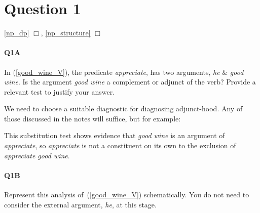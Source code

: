 \documentclass{article}
\begin{document}
\maketitle
\subtitle{Tutorial Notes Week 7: Topics 7 \& 8}

\section*{Question 1}%
\hfill{} \ref{np_dp} $\Box$,
\ref{np_structure} $\Box$

\paragraph{Q1A} In (\ref{good_wine_V}), the predicate \emph{appreciate}, has two arguments, \emph{he} \& \emph{good wine}.
Is the argument \emph{good wine} a complement or adjunct of the verb?
Provide a relevant test to justify your answer.

\begin{exe}
    \label{good_wine}
\end{exe}

\begin{answer}
{
We need to choose a suitable diagnostic for diagnosing adjunct-hood.
Any of those discussed in the notes will suffice, but for example:
\begin{exe}
\end{exe}
This substitution test shows evidence that \emph{good wine} is an argument of \emph{appreciate}, so \emph{appreciate} is not a constituent on its own to the exclusion of \emph{appreciate good wine}.
}
\end{answer}

\paragraph{Q1B} Represent this analysis of~(\ref{good_wine_V}) schematically. You do not need to consider the external argument, \emph{he}, at this stage.
\end{document}
